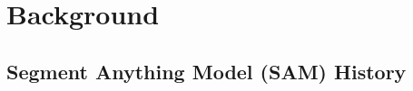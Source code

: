 \documentclass[author={Jacob Stephenson},
    degree={BSc},
    title={Robust Great Ape Species Detection in Wild Camera Trap Imagery with Promptable Concept Segmentation},
    unit={COMS30045},
    subtitle={}]{dissertation}
\begin{document}















\chapter{Background}
\label{chap:bg}

\section{Segment Anything Model (SAM) History}
\end{document}
